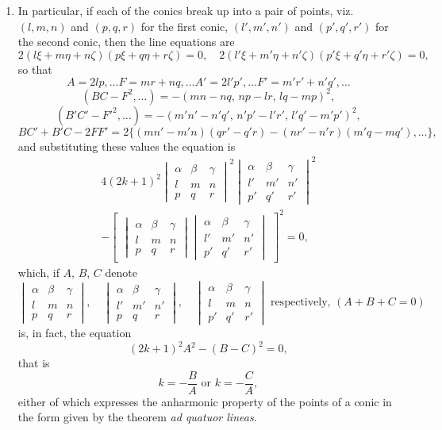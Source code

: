 \documentclass[12pt,a4paper]{article}
\theoremstyle{plain}
\theoremstyle{definition}
\theoremstyle{remark}
\begin{document}
\begin{enumerate}[label=\arabic*.]
\item In particular, if each of the conics break up into a pair of points, viz. $(l,m,n)$ and $(p,q,r)$ for the first conic, $(l',m',n')$ and $(p',q',r')$ for the second conic, then the line equations are
\[2(l\xi + m\eta + n\zeta)(p\xi + q\eta + r\zeta) = 0, \quad 2(l'\xi + m'\eta + n'\zeta)(p'\xi + q'\eta + r'\zeta) = 0,\]
so that
\[A = 2lp, \ldots F = mr + nq, \ldots A' = 2l'p', \ldots F' = m'r' + n'q', \ldots\]
\[(BC - F^2, \ldots) = -(mn - nq,\, np - lr,\, lq - mp)^2,\]
\[(B'C' - F'^2, \ldots) = -(m'n' - n'q',\, n'p' - l'r',\, l'q' - m'p')^2,\]
\[BC' + B'C - 2FF' = 2\{(mn' - m'n)(qr' - q'r) - (nr' - n'r)(m'q - mq'), \ldots\},\]
and substituting these values the equation is
\begin{multline*}
4(2k+1)^2
\begin{vmatrix}
\alpha & \beta & \gamma \\
l & m & n \\
p & q & r
\end{vmatrix}^2
\begin{vmatrix}
\alpha & \beta & \gamma \\
l' & m' & n' \\
p' & q' & r'
\end{vmatrix}^2 \\
- \begin{bmatrix}
\begin{vmatrix}
\alpha & \beta & \gamma \\
l & m & n \\
p & q & r
\end{vmatrix}
\begin{vmatrix}
\alpha & \beta & \gamma \\
l' & m' & n' \\
p' & q' & r'
\end{vmatrix}
\end{bmatrix}^2 = 0,
\end{multline*}
which, if $A$, $B$, $C$ denote
\[\begin{vmatrix}
\alpha & \beta & \gamma \\
l & m & n \\
p & q & r
\end{vmatrix}, \quad
\begin{vmatrix}
\alpha & \beta & \gamma \\
l' & m' & n' \\
p & q & r
\end{vmatrix}, \quad
\begin{vmatrix}
\alpha & \beta & \gamma \\
l & m & n \\
p' & q' & r'
\end{vmatrix}
\text{ respectively, } (A + B + C = 0)\]
is, in fact, the equation
\[(2k+1)^2 A^2 - (B-C)^2 = 0,\]
that is
\[k = -\frac{B}{A} \text{ or } k = -\frac{C}{A},\]
either of which expresses the anharmonic property of the points of a conic in the form given by the theorem \textit{ad quatuor lineas}.


\end{enumerate}
\end{document}
